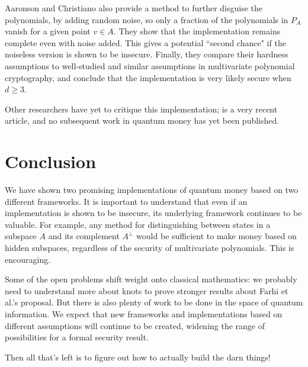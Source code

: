 \documentclass[12pt]{article}
\begin{document}
Aaronson and Christiano also provide a method to further disguise the polynomials, by adding random noise, so only a fraction of the polynomials in $P_A$ vanish for a given point $v \in A$.  They show that the implementation remains complete even with noise added.  This gives a potential ``second chance" if the noiseless version is shown to be insecure.  Finally, they compare their hardness assumptions to well-studied and similar assumptions in multivariate polynomial cryptography, and conclude that the implementation is very likely secure when $d \geq 3$.

Other researchers have yet to critique this implementation; \cite{Aar13} is a very recent article, and no subsequent work in quantum money has yet been published.

\section{Conclusion}
We have shown two promising implementations of quantum money based on two different frameworks.  It is important to understand that even if an implementation is shown to be insecure, its underlying framework continues to be valuable.  For example, any method for distinguishing between states in a subspace $A$ and its complement $A^\perp$ would be sufficient to make money based on hidden subspaces, regardless of the security of multivariate polynomials.  This is encouraging.

Some of the open problems shift weight onto classical mathematics: we probably need to understand more about knots to prove stronger results about Farhi et al.'s proposal.  But there is also plenty of work to be done in the space of quantum information.  We expect that new frameworks and implementations based on different assumptions will continue to be created, widening the range of possibilities for a formal security result.

Then all that's left is to figure out how to actually build the darn things!


\newpage


\end{document}
